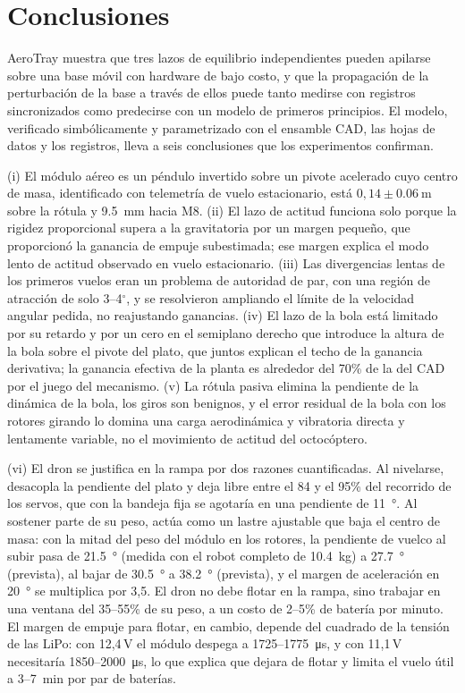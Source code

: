 \section{Conclusiones}
\label{sec:conclusions}
AeroTray muestra que tres lazos de equilibrio independientes pueden apilarse sobre una base móvil con hardware de bajo costo, y que la propagación de la perturbación de la base a través de ellos puede tanto medirse con registros sincronizados como predecirse con un modelo de primeros principios. El modelo, verificado simbólicamente y parametrizado con el ensamble CAD, las hojas de datos y los registros, lleva a seis conclusiones que los experimentos confirman.

(i) El módulo aéreo es un péndulo invertido sobre un pivote acelerado cuyo centro de masa, identificado con telemetría de vuelo estacionario, está $0{,}14\pm\SI{0.06}{\metre}$ sobre la rótula y \SI{9.5}{\milli\metre} hacia M8. (ii) El lazo de actitud funciona solo porque la rigidez proporcional supera a la gravitatoria por un margen pequeño, que proporcionó la ganancia de empuje subestimada; ese margen explica el modo lento de actitud observado en vuelo estacionario. (iii) Las divergencias lentas de los primeros vuelos eran un problema de autoridad de par, con una región de atracción de solo 3--4$^\circ$, y se resolvieron ampliando el límite de la velocidad angular pedida, no reajustando ganancias. (iv) El lazo de la bola está limitado por su retardo y por un cero en el semiplano derecho que introduce la altura de la bola sobre el pivote del plato, que juntos explican el techo de la ganancia derivativa; la ganancia efectiva de la planta es alrededor del 70\% de la del CAD por el juego del mecanismo. (v) La rótula pasiva elimina la pendiente de la dinámica de la bola, los giros son benignos, y el error residual de la bola con los rotores girando lo domina una carga aerodinámica y vibratoria directa y lentamente variable, no el movimiento de actitud del octocóptero.

(vi) El dron se justifica en la rampa por dos razones cuantificadas. Al nivelarse, desacopla la pendiente del plato y deja libre entre el 84 y el 95\% del recorrido de los servos, que con la bandeja fija se agotaría en una pendiente de \SI{11}{\degree}. Al sostener parte de su peso, actúa como un lastre ajustable que baja el centro de masa: con la mitad del peso del módulo en los rotores, la pendiente de vuelco al subir pasa de \SI{21.5}{\degree} (medida con el robot completo de \SI{10.4}{\kilo\gram}) a \SI{27.7}{\degree} (prevista), al bajar de \SI{30.5}{\degree} a \SI{38.2}{\degree} (prevista), y el margen de aceleración en \SI{20}{\degree} se multiplica por 3,5. El dron no debe flotar en la rampa, sino trabajar en una ventana del 35--55\% de su peso, a un costo de 2--5\% de batería por minuto. El margen de empuje para flotar, en cambio, depende del cuadrado de la tensión de las LiPo: con 12,4\,V el módulo despega a 1725--\SI{1775}{\micro\second}, y con 11,1\,V necesitaría 1850--\SI{2000}{\micro\second}, lo que explica que dejara de flotar y limita el vuelo útil a 3--\SI{7}{\minute} por par de baterías.

